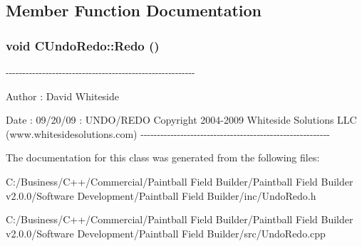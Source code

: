 \subsection{Member Function Documentation}
\hypertarget{class_c_undo_redo_a006d3ce73fa8eb51e69b492fdc60ead7}{
\subsubsection[{Redo}]{\setlength{\rightskip}{0pt plus 5cm}void CUndoRedo::Redo ()}}
\label{class_c_undo_redo_a006d3ce73fa8eb51e69b492fdc60ead7}
-\/-\/-\/-\/-\/-\/-\/-\/-\/-\/-\/-\/-\/-\/-\/-\/-\/-\/-\/-\/-\/-\/-\/-\/-\/-\/-\/-\/-\/-\/-\/-\/-\/-\/-\/-\/-\/-\/-\/-\/-\/-\/-\/-\/-\/-\/-\/-\/-\/-\/-\/-\/-\/-\/-\/-\/-\/ \begin{DoxyAuthor}{Author}
: David Whiteside 
\end{DoxyAuthor}
\begin{DoxyDate}{Date}
: 09/20/09 : UNDO/REDO Copyright 2004-\/2009 Whiteside Solutions LLC (www.whitesidesolutions.com) -\/-\/-\/-\/-\/-\/-\/-\/-\/-\/-\/-\/-\/-\/-\/-\/-\/-\/-\/-\/-\/-\/-\/-\/-\/-\/-\/-\/-\/-\/-\/-\/-\/-\/-\/-\/-\/-\/-\/-\/-\/-\/-\/-\/-\/-\/-\/-\/-\/-\/-\/-\/-\/-\/-\/-\/-\/ 
\end{DoxyDate}


The documentation for this class was generated from the following files:\begin{DoxyCompactItemize}
\item 
C:/Business/C++/Commercial/Paintball Field Builder/Paintball Field Builder v2.0.0/Software Development/Paintball Field Builder/inc/UndoRedo.h\item 
C:/Business/C++/Commercial/Paintball Field Builder/Paintball Field Builder v2.0.0/Software Development/Paintball Field Builder/src/UndoRedo.cpp\end{DoxyCompactItemize}
